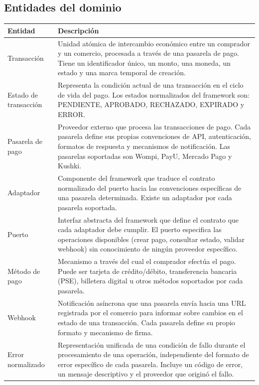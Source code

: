 \documentclass[10pt]{article}
\begin{document}
\subsection{Entidades del dominio}

\begin{table}[htbp]
  \centering
  \renewcommand{\arraystretch}{1.2}
  \begin{tabularx}{\textwidth}{|l|X|}
    \hline
    \textbf{Entidad} & \textbf{Descripción} \\
    \hline
    Transacción & Unidad atómica de intercambio económico entre un comprador y un comercio, procesada a través de una pasarela de pago. Tiene un identificador único, un monto, una moneda, un estado y una marca temporal de creación. \\
    \hline
    Estado de transacción & Representa la condición actual de una transacción en el ciclo de vida del pago. Los estados normalizados del framework son: PENDIENTE, APROBADO, RECHAZADO, EXPIRADO y ERROR. \\
    \hline
    Pasarela de pago & Proveedor externo que procesa las transacciones de pago. Cada pasarela define sus propias convenciones de API, autenticación, formatos de respuesta y mecanismos de notificación. Las pasarelas soportadas son Wompi, PayU, Mercado Pago y Kushki. \\
    \hline
    Adaptador & Componente del framework que traduce el contrato normalizado del puerto hacia las convenciones específicas de una pasarela determinada. Existe un adaptador por cada pasarela soportada. \\
    \hline
    Puerto & Interfaz abstracta del framework que define el contrato que cada adaptador debe cumplir. El puerto especifica las operaciones disponibles (crear pago, consultar estado, validar webhook) sin conocimiento de ningún proveedor específico. \\
    \hline
    Método de pago & Mecanismo a través del cual el comprador efectúa el pago. Puede ser tarjeta de crédito/débito, transferencia bancaria (PSE), billetera digital u otros métodos soportados por cada pasarela. \\
    \hline
    Webhook & Notificación asíncrona que una pasarela envía hacia una URL registrada por el comercio para informar sobre cambios en el estado de una transacción. Cada pasarela define su propio formato y mecanismo de firma. \\
    \hline
    Error normalizado & Representación unificada de una condición de fallo durante el procesamiento de una operación, independiente del formato de error específico de cada pasarela. Incluye un código de error, un mensaje descriptivo y el proveedor que originó el fallo. \\

\end{tabularx}
\end{table}
\end{document}

